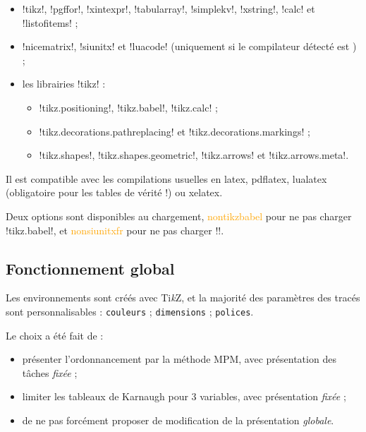 \documentclass[french,a4paper,11pt]{article}
\providecommand\tikzlogo{Ti\textit{k}Z}
\let\TikZ\tikzlogo
\newcommand\Cle[1]{{\small\sffamily\textlangle \textcolor{orange}{#1}\textrangle}}
\begin{document}
{{\begin{noteblock}
\begin{itemize}
	\item \packagetex!tikz!, \packagetex!pgffor!, \packagetex!xintexpr!, \packagetex!tabularray!, \packagetex!simplekv!, \packagetex!xstring!, \packagetex!calc! et \packagetex!listofitems! ;
	\item \packagetex!nicematrix!, \packagetex!siunitx! et \packagetex!luacode! (uniquement si le compilateur détecté est ) ;
	\item les librairies \packagetex!tikz! :
	\begin{itemize}
		\item \motcletex!tikz.positioning!, \motcletex!tikz.babel!, \motcletex!tikz.calc! ;
		\item \motcletex!tikz.decorations.pathreplacing! et \motcletex!tikz.decorations.markings! ;
		\item \motcletex!tikz.shapes!, \motcletex!tikz.shapes.geometric!, \motcletex!tikz.arrows! et \motcletex!tikz.arrows.meta!.
	\end{itemize}
\end{itemize}

Il est compatible avec les compilations usuelles en \textsf{latex}, \textsf{pdflatex}, \textsf{lualatex} (obligatoire pour les tables de vérité !) ou \textsf{xelatex}.
\end{noteblock}

\begin{warningblock}
Deux options sont disponibles au chargement, \Cle{nontikzbabel} pour ne pas charger \motcletex!tikz.babel!, et \Cle{nonsiunitxfr} pour ne pas charger \motcletex!!.
\end{warningblock}

\subsection{Fonctionnement global}

\begin{tipblock}
Les environnements sont créés avec \TikZ, et la majorité des paramètres des tracés sont personnalisables : \texttt{couleurs} ; \texttt{dimensions} ; \texttt{polices}.
\end{tipblock}

\begin{noteblock}
Le choix a été fait de :

\begin{itemize}
	\item présenter l'ordonnancement par la méthode MPM, avec présentation des tâches \textit{fixée} ;
	\item limiter les tableaux de Karnaugh pour 3 variables, avec présentation \textit{fixée} ;
	\item de ne pas forcément proposer de modification de la présentation \textit{globale}.
\end{itemize}
\vspace*{-\baselineskip}\leavevmode
\end{noteblock}

}}
\end{document}
